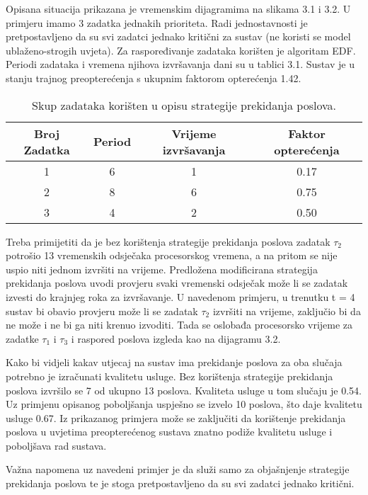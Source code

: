 \documentclass[../zavrsni.tex]{subfiles}
\begin{document}
Opisana situacija prikazana je vremenskim dijagramima na slikama 3.1 i 3.2. U primjeru imamo 3 zadatka jednakih prioriteta. Radi jednostavnosti
je pretpostavljeno da su svi zadatci jednako kritični za sustav (ne koristi se model ublaženo-strogih uvjeta). Za raspoređivanje zadataka korišten je algoritam EDF. 
Periodi zadataka i vremena njihova izvršavanja dani su u tablici 3.1. Sustav je u stanju trajnog preopterećenja s ukupnim
faktorom opterećenja 1.42.

\begin{table}[h!]
\begin{center}
  \begin{tabular}{||c || c c c||} 
   \hline
   Broj Zadatka & Period & Vrijeme izvršavanja & Faktor opterećenja \\ [0.5ex] 
   \hline\hline
   1 & 6 & 1 & 0.17 \\ 
   \hline
   2 & 8 & 6 & 0.75 \\
   \hline
   3 & 4 & 2 & 0.50 \\
   \hline
  \end{tabular}
\end{center}
\caption{\label{tab:table-name}Skup zadataka korišten u opisu strategije prekidanja poslova.}
\end{table}

Treba primijetiti da je bez korištenja strategije prekidanja poslova zadatak $\tau_2$ potrošio 13 vremenskih odsječaka procesorskog vremena, a 
na pritom se nije uspio niti jednom izvršiti na vrijeme.
Predložena modificirana strategija prekidanja poslova uvodi provjeru svaki vremenski odsječak može li se zadatak izvesti do  krajnjeg roka 
za izvršavanje. 
U navedenom primjeru, u 
trenutku t = 4 sustav bi obavio provjeru može li se zadatak $\tau_2$ izvršiti na vrijeme, zaključio bi da ne može i ne bi ga niti krenuo
izvoditi. Tada se oslobađa procesorsko vrijeme za zadatke $\tau_1$ i $\tau_3$ i
raspored poslova izgleda kao na dijagramu 3.2. 

Kako bi vidjeli kakav utjecaj na sustav ima prekidanje poslova za oba slučaja potrebno je izračunati kvalitetu usluge.
Bez korištenja strategije prekidanja poslova
izvršilo se 7 od ukupno 13 poslova. Kvaliteta usluge u tom slučaju je 0.54. Uz primjenu opisanog poboljšanja uspješno se izvelo 10 
poslova, što daje kvalitetu usluge 0.67. Iz prikazanog primjera može se zaključiti da korištenje prekidanja poslova u uvjetima 
preopterećenog sustava znatno podiže kvalitetu usluge i poboljšava rad sustava.

Važna napomena uz navedeni primjer je da služi samo za objašnjenje strategije prekidanja poslova te je stoga 
pretpostavljeno da su svi zadatci jednako kritični.  
\end{document}
